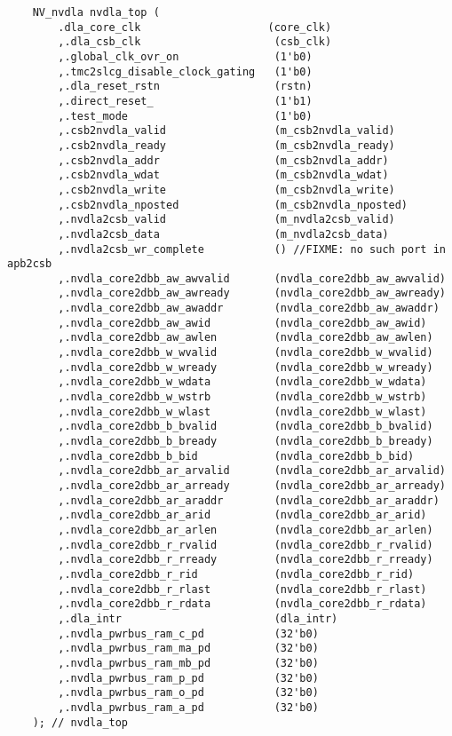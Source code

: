 \begin{lstlisting}
    NV_nvdla nvdla_top (
        .dla_core_clk                    (core_clk)
        ,.dla_csb_clk                     (csb_clk)
        ,.global_clk_ovr_on               (1'b0)
        ,.tmc2slcg_disable_clock_gating   (1'b0)
        ,.dla_reset_rstn                  (rstn)
        ,.direct_reset_                   (1'b1)
        ,.test_mode                       (1'b0)
        ,.csb2nvdla_valid                 (m_csb2nvdla_valid)
        ,.csb2nvdla_ready                 (m_csb2nvdla_ready)
        ,.csb2nvdla_addr                  (m_csb2nvdla_addr)
        ,.csb2nvdla_wdat                  (m_csb2nvdla_wdat)
        ,.csb2nvdla_write                 (m_csb2nvdla_write)
        ,.csb2nvdla_nposted               (m_csb2nvdla_nposted)
        ,.nvdla2csb_valid                 (m_nvdla2csb_valid)
        ,.nvdla2csb_data                  (m_nvdla2csb_data)
        ,.nvdla2csb_wr_complete           () //FIXME: no such port in apb2csb
        ,.nvdla_core2dbb_aw_awvalid       (nvdla_core2dbb_aw_awvalid)
        ,.nvdla_core2dbb_aw_awready       (nvdla_core2dbb_aw_awready)
        ,.nvdla_core2dbb_aw_awaddr        (nvdla_core2dbb_aw_awaddr)
        ,.nvdla_core2dbb_aw_awid          (nvdla_core2dbb_aw_awid)
        ,.nvdla_core2dbb_aw_awlen         (nvdla_core2dbb_aw_awlen)
        ,.nvdla_core2dbb_w_wvalid         (nvdla_core2dbb_w_wvalid)
        ,.nvdla_core2dbb_w_wready         (nvdla_core2dbb_w_wready)
        ,.nvdla_core2dbb_w_wdata          (nvdla_core2dbb_w_wdata)
        ,.nvdla_core2dbb_w_wstrb          (nvdla_core2dbb_w_wstrb)
        ,.nvdla_core2dbb_w_wlast          (nvdla_core2dbb_w_wlast)
        ,.nvdla_core2dbb_b_bvalid         (nvdla_core2dbb_b_bvalid)
        ,.nvdla_core2dbb_b_bready         (nvdla_core2dbb_b_bready)
        ,.nvdla_core2dbb_b_bid            (nvdla_core2dbb_b_bid)
        ,.nvdla_core2dbb_ar_arvalid       (nvdla_core2dbb_ar_arvalid)
        ,.nvdla_core2dbb_ar_arready       (nvdla_core2dbb_ar_arready)
        ,.nvdla_core2dbb_ar_araddr        (nvdla_core2dbb_ar_araddr)
        ,.nvdla_core2dbb_ar_arid          (nvdla_core2dbb_ar_arid)
        ,.nvdla_core2dbb_ar_arlen         (nvdla_core2dbb_ar_arlen)
        ,.nvdla_core2dbb_r_rvalid         (nvdla_core2dbb_r_rvalid)
        ,.nvdla_core2dbb_r_rready         (nvdla_core2dbb_r_rready)
        ,.nvdla_core2dbb_r_rid            (nvdla_core2dbb_r_rid)
        ,.nvdla_core2dbb_r_rlast          (nvdla_core2dbb_r_rlast)
        ,.nvdla_core2dbb_r_rdata          (nvdla_core2dbb_r_rdata)
        ,.dla_intr                        (dla_intr)
        ,.nvdla_pwrbus_ram_c_pd           (32'b0)
        ,.nvdla_pwrbus_ram_ma_pd          (32'b0)
        ,.nvdla_pwrbus_ram_mb_pd          (32'b0)
        ,.nvdla_pwrbus_ram_p_pd           (32'b0)
        ,.nvdla_pwrbus_ram_o_pd           (32'b0)
        ,.nvdla_pwrbus_ram_a_pd           (32'b0)
    ); // nvdla_top


\end{lstlisting}

